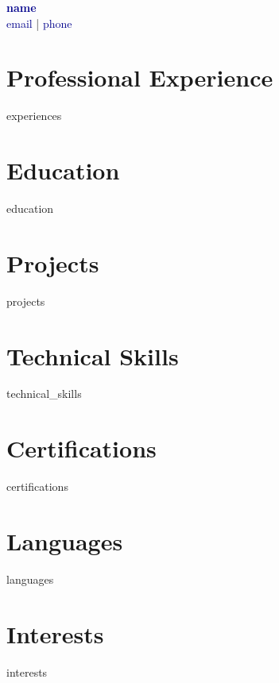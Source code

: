 \documentclass[11pt]{article}
\begin{document}
\begin{center}
    {\huge \textbf{\textcolor{darkblue}{{{ name }}}}} \\
    \vspace{5pt}
    \textcolor{darkblue}{{{ email }}} | \textcolor{darkblue}{{{ phone }}} \\
\end{center}

\vspace{10pt}

\section*{Professional Experience}
{{ experiences }}

\section*{Education}
{{ education }}

\section*{Projects}
{{ projects }}

\section*{Technical Skills}
{{ technical_skills }}

\section*{Certifications}
{{ certifications }}

\section*{Languages}
{{ languages }}

\section*{Interests}
{{ interests }}
\end{document}

